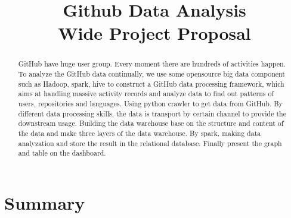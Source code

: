\documentclass[conference]{IEEEtran}
\begin{document}
\title{Github Data Analysis\\
{\small Wide Project Proposal}
}

\author{
\and
{}
}

\maketitle

\begin{abstract}
    GitHub have huge user group. Every moment there are hundreds of activities happen. To analyze the GitHub data continually, we use some opensource big data component such as Hadoop, spark, hive to construct a GitHub data processing framework, which aims at handling massive activity records and analyze data to find out patterns of users, repositories and languages. Using python crawler to get data from GitHub. By different data processing skills, the data is transport by certain channel to provide the downstream usage. Building the data warehouse base on the structure and content of the data and make three layers of the data warehouse. By spark, making data analyzation and store the result in the relational database. Finally present the graph and table on the dashboard.
\end{abstract}
















\section{Summary}
\end{document}
